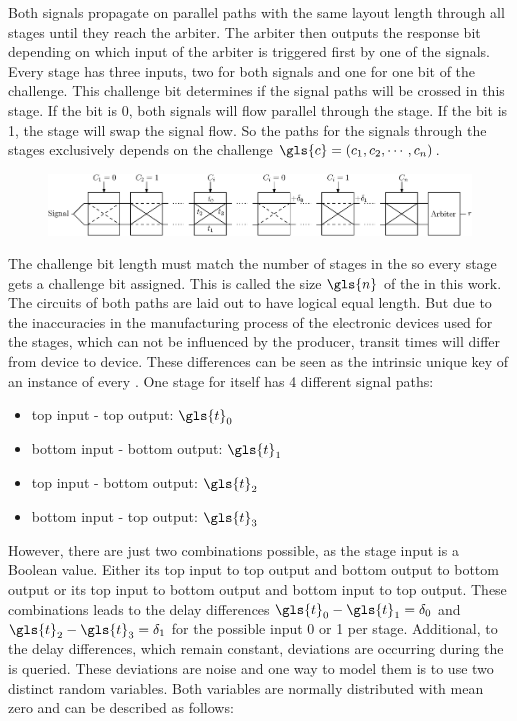 Both signals propagate on parallel paths with the same layout length through all stages until they reach the arbiter.
The arbiter then outputs the response bit depending on which input of the arbiter is triggered first by one of the signals. %
Every stage has three inputs, two for both signals and one for one bit of the challenge.
This challenge bit determines if the signal paths will be crossed in this stage. %
If the bit is 0, both signals will flow parallel through the stage.
If the bit is 1, the stage will swap the signal flow.
So the paths for the signals through the stages exclusively depends on the challenge $\gls{c} = (c_1, c_2, \cdots, c_n)$.

\begin{figure}[ht]
\centering
\includegraphics[width=1.00\textwidth]{images/arbiter_puf.eps}
\caption{\apuf}
\label{fig:arbiter}
\end{figure}

The challenge bit length must match the number of stages in the \apuf so every stage gets a challenge bit assigned. 
This is called the size $\gls{n}$ of the \apuf in this work. %
The circuits of both paths are laid out to have logical equal length.
But due to the inaccuracies in the manufacturing process of the electronic devices used for the stages, which can not be influenced by the producer, transit times will differ from device to device.
These differences can be seen as the intrinsic unique key of an instance of every \apuf. %
One stage for itself has 4 different signal paths: 

\begin{itemize}
\item top input - top output: $\gls{t}_0$
\item bottom input - bottom output: $\gls{t}_1$
\item top input - bottom output: $\gls{t}_2$
\item bottom input - top output: $\gls{t}_3$
\end{itemize}

However, there are just two combinations possible, as the stage input is a Boolean value.
Either its top input to top output and bottom output to bottom output or its top input to bottom output and bottom input to top output.
These combinations leads to the delay differences $\gls{t}_0 - \gls{t}_1 = \delta_0$ and $\gls{t}_2 - \gls{t}_3 = \delta_1$ for the possible input 0 or 1 per stage. %
Additional, to the delay differences, which remain constant, deviations are occurring during the \apuf is queried.
These deviations are noise and one way to model them is to use two distinct random variables.
Both variables are normally distributed with mean zero and can be described as follows:

